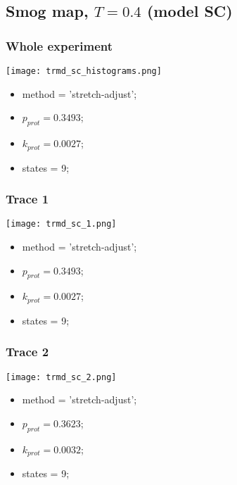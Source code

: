 \subsection{Smog map, $T=0.4$ (model SC)}
\subsubsection{Whole experiment}
\begin{minipage}[c]{0.7\textwidth}
    \texttt{[image: trmd\_sc\_histograms.png]}
\end{minipage}
\hfill
\begin{minipage}[c]{0.45\textwidth}
    \begin{itemize}
        \item method = 'stretch-adjust';
        \item $p_{prot}=0.3493$;
        \item $k_{prot}=0.0027$;
        \item states = 9;
    \end{itemize}
\end{minipage}

\subsubsection{Trace 1}
\begin{minipage}[c]{0.7\textwidth}
    \texttt{[image: trmd\_sc\_1.png]}
\end{minipage}
\hfill
\begin{minipage}[c]{0.45\textwidth}
    \begin{itemize}
        \item method = 'stretch-adjust';
        \item $p_{prot}=0.3493$;
        \item $k_{prot}=0.0027$;
        \item states = 9;
    \end{itemize}
\end{minipage}

\subsubsection{Trace 2}
\begin{minipage}[c]{0.7\textwidth}
    \texttt{[image: trmd\_sc\_2.png]}
\end{minipage}
\hfill
\begin{minipage}[c]{0.45\textwidth}
    \begin{itemize}
        \item method = 'stretch-adjust';
        \item $p_{prot}=0.3623$;
        \item $k_{prot}=0.0032$;
        \item states = 9;
    \end{itemize}
\end{minipage}

